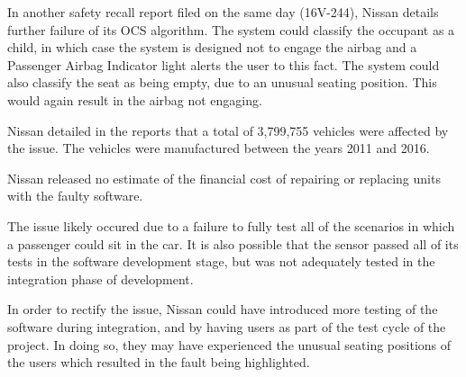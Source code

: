 \documentclass[a4paper,12pt]{article}
\begin{document}
In another safety recall report filed on the same day (16V-244), Nissan details further failure of its OCS algorithm. The system could classify the occupant as a child, in which case the system is designed not to engage the airbag and a Passenger Airbag Indicator light alerts the user to this fact. The system could also classify the seat as being empty, due to an unusual seating position. This would again result in the airbag not engaging.

Nissan detailed in the reports that a total of 3,799,755 vehicles were affected by the issue. The vehicles were manufactured between the years 2011 and 2016.

Nissan released no estimate of the financial cost of repairing or replacing units with the faulty software.

The issue likely occured due to a failure to fully test all of the scenarios in which a passenger could sit in the car. It is also possible that the sensor passed all of its tests in the software development stage, but was not adequately tested in the integration phase of development.

In order to rectify the issue, Nissan could have introduced more testing of the software during integration, and by having users as part of the test cycle of the project. In doing so, they may have experienced the unusual seating positions of the users which resulted in the fault being highlighted.

\newpage
\end{document}
